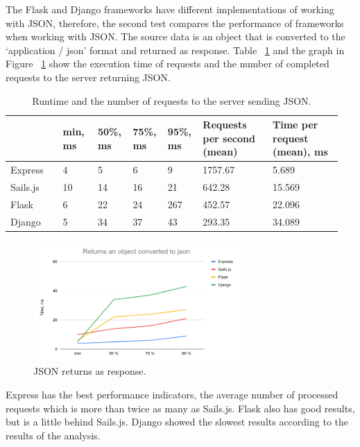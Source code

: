 \documentclass[runningheads]{llncs}
\begin{document}
The Flask and Django frameworks have different implementations of working with JSON, therefore, the second test compares the performance of frameworks when working with JSON. The source data is an object that is converted to the ‘application / json’ format and returned as response. Table ~\ref{tab4}  and the graph in Figure ~\ref{fig4}  show the execution time of requests and the number of completed requests to the server returning JSON.


\begin{table}
\caption{ Runtime and the number of requests to the server sending JSON.}\label{tab4}
\begin{tabular}{|p{0.15\linewidth}|p{0.1\linewidth}|p{0.1\linewidth}|p{0.1\linewidth}|p{0.1\linewidth}|p{0.2\linewidth}|p{0.2\linewidth}|}
\hline
& min, ms & 50\%, ms & 75\%, ms & 95\%, ms & Requests per second (mean) & Time per request (mean), ms\\
\hline
Express & 4 & 5 & 6 & 9 & 1757.67 & 5.689 \\
\hline
Sails.js & 10 & 14 & 16 & 21 & 642.28 & 15.569 \\
\hline
Flask & 6 & 22 & 24 & 267 & 452.57 & 22.096 \\
\hline
Django & 5 & 34 & 37 & 43 & 293.35 & 34.089\\
\hline
\end{tabular}
\end{table}

\begin{figure}
    \centering
        \includegraphics[width=0.7\textwidth]{fig-4.png}
    \caption{JSON returns as response.} \label{fig4}
\end{figure}

Express has the best performance indicators, the average number of processed requests which is more than twice as many as Sails.js. Flask also has good results, but is a little behind Sails.js. Django showed the slowest results according to the results of the analysis.
\end{document}
